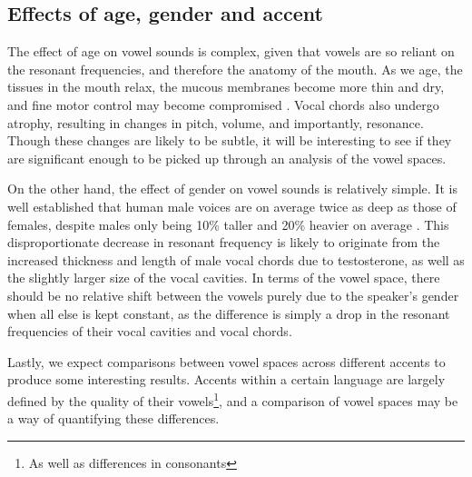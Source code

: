 \subsection{Effects of age, gender and accent}

The effect of age on vowel sounds is complex, given that vowels are so reliant on the resonant frequencies, and therefore the anatomy of the mouth. As we age, the tissues in the mouth relax, the mucous membranes become more thin and dry, and fine motor control may become compromised \cite{voiceaging}. Vocal chords also undergo atrophy, resulting in changes in pitch, volume, and importantly, resonance. Though these changes are likely to be subtle, it will be interesting to see if they are significant enough to be picked up through an analysis of the vowel spaces.

On the other hand, the effect of gender on vowel sounds is relatively simple. It is well established that human male voices are on average twice as deep as those of females, despite males only being 10\% taller and 20\% heavier on average \cite{ghazanfar2008evolution}. This disproportionate decrease in resonant frequency is likely to originate from the increased thickness and length of male vocal chords due to testosterone, as well as the slightly larger size of the vocal cavities. In terms of the vowel space, there should be no relative shift between the vowels purely due to the speaker's gender when all else is kept constant, as the difference is simply a drop in the resonant frequencies of their vocal cavities and vocal chords. 

Lastly, we expect comparisons between vowel spaces across different accents to produce some interesting results. Accents within a certain language are largely defined by the quality of their vowels\footnote{As well as differences in consonants}, and a comparison of vowel spaces may be a way of quantifying these differences.